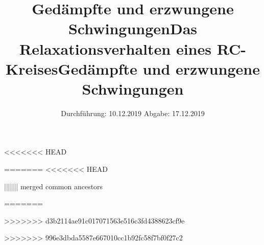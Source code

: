 

<<<<<<< HEAD
\subject{Versuch 354}
=======
<<<<<<< HEAD
\subject{Versuch 354}
\title{Gedämpfte und erzwungene Schwingungen}
||||||| merged common ancestors
\subject{Versuch 353}
\title{Das Relaxationsverhalten eines RC-Kreises}
=======
\subject{Versuch 353}
>>>>>>> d3b2114ae91c017071563e516c3fd4388623cf9e
\title{Gedämpfte und erzwungene Schwingungen}
>>>>>>> 996e3dbda5587e667010cc1b92fc58f7bf0f27c2
\date{%
  Durchführung: 10.12.2019
  \hspace{3em}
  Abgabe: 17.12.2019
}



\maketitle
\thispagestyle{empty}
\tableofcontents
\newpage






\nocite{*}
\printbibliography{}


